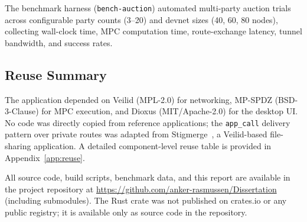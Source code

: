 The benchmark harness (\texttt{bench-auction}) automated multi-party auction
trials across configurable party counts (3--20) and devnet sizes (40, 60, 80
nodes), collecting wall-clock time, MPC computation time, route-exchange
latency, tunnel bandwidth, and success rates.

\subsection*{Reuse Summary}

The application depended on Veilid (MPL-2.0) for networking, MP-SPDZ
(BSD-3-Clause) for MPC execution, and Dioxus (MIT/Apache-2.0) for the
desktop UI.  No code was directly copied from reference applications; the
\texttt{app\_call} delivery pattern over private routes was adapted from
Stigmerge~\cite{stigmerge2024}, a Veilid-based file-sharing application.
A detailed component-level reuse table is provided in Appendix~\ref{app:reuse}.

All source code, build scripts, benchmark data, and this report are available
in the project repository at
\url{https://github.com/anker-rasmussen/Dissertation} (including submodules).
The Rust crate was not published on crates.io or any public registry; it is
available only as source code in the repository.
